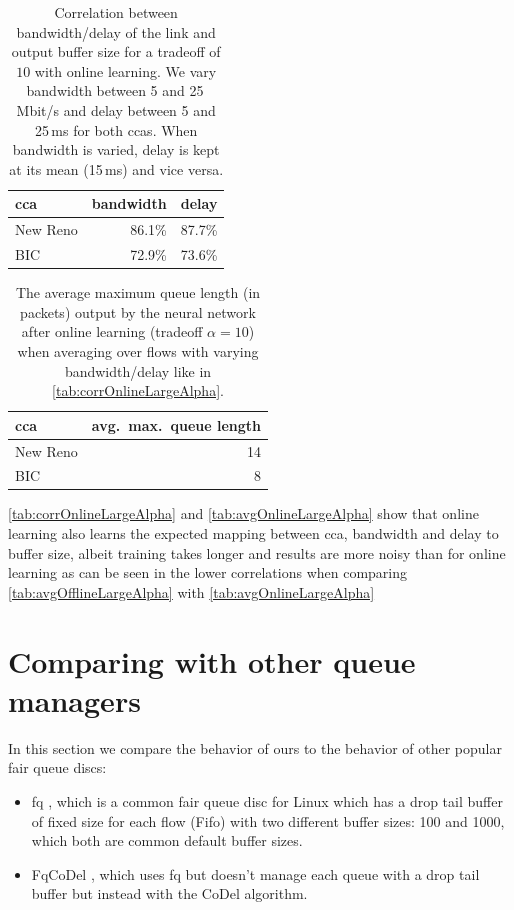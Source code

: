 \documentclass[conference]{IEEEtran}
\begin{document}
\begin{table}[h]
\caption{Correlation between bandwidth/delay of the link and output buffer size for a tradeoff of $10$ with online learning. We vary bandwidth between 5 and 25\,Mbit/s and delay between 5 and 25\,ms for both \glspl{cca}. When bandwidth is varied, delay is kept at its mean (15\,ms) and vice versa.} \label{tab:corrOnlineLargeAlpha}
\centering
\begin{tabular}{lrr} \toprule
\gls{cca} & bandwidth & delay \\ \midrule
New Reno & 86.1\% & 87.7\% \\
BIC & 72.9\% & 73.6\% \\
\bottomrule
\end{tabular}
\end{table}

\begin{table}[h]
\caption{The average maximum queue length (in packets) output by the neural network after online learning (tradeoff $\alpha=10$) when averaging over flows with varying bandwidth/delay like in \autoref{tab:corrOnlineLargeAlpha}.} \label{tab:avgOnlineLargeAlpha}
\centering
\begin{tabular}{lr} \toprule
\gls{cca} & avg.~max.~queue length \\ \midrule
New Reno & 14 \\
BIC & 8 \\
\bottomrule
\end{tabular}
\end{table}

\autoref{tab:corrOnlineLargeAlpha} and \autoref{tab:avgOnlineLargeAlpha} show that online learning also learns the expected mapping between \gls{cca}, bandwidth and delay to buffer size, albeit training takes longer and results are more noisy than for online learning as can be seen in the lower correlations when comparing \autoref{tab:avgOfflineLargeAlpha} with \autoref{tab:avgOnlineLargeAlpha}

\section{Comparing with other queue managers}

In this section we compare the behavior of \gls{ours} to the behavior of other popular fair queue discs: \begin{itemize}
\item fq \cite{dumazet_pkt_sched:_2013}, which is a common fair queue disc for Linux which has a drop tail buffer of fixed size for each flow (Fifo) with two different buffer sizes: 100 and 1000, which both are common default buffer sizes. 
\item FqCoDel \cite{taht_flow_2018}, which uses fq but doesn't manage each queue with a drop tail buffer but instead with the CoDel algorithm. 
\end{itemize}
\end{document}
